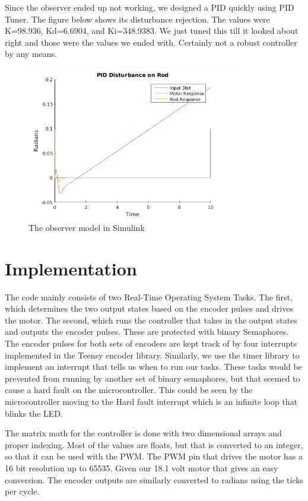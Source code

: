 \documentclass[12pt]{extarticle}
\newenvironment{sect}
  {\adjustwidth{-2.25em}{0pt}}
  {\endadjustwidth}
\begin{document}
\begin{sect}
Since the observer ended up not working, we designed a PID quickly using PID Tuner. The figure below shows its disturbance rejection. The values were K=98.936, Kd=6.6904, and Ki=348.9383. We just tuned this till it looked about right and those were the values we ended with. Certainly not a robust controller by any means.
\begin{figure}[H]
    \centering
    \includegraphics[width=0.8\textwidth]{Images/PID_DIST.png}
    \caption{The observer model in Simulink}
\end{figure}


\end{sect}


\begin{sect}
\section{Implementation}
The code mainly consists of two Real-Time Operating System Tasks. The first, which determines the two output states based on the encoder pulses and drives the motor. The second, which runs the controller that takes in the output states and outputs the encoder pulses. These are protected with binary Semaphores. The encoder pulses for both sets of encoders are kept track of by four interrupts implemented in the Teensy encoder library. Similarly, we use the timer library to implement an interrupt that tells us when to run our tasks. These tasks would be prevented from running by another set of binary semaphores, but that seemed to cause a hard fault on the microcontroller. This could be seen by the microcontroller moving to the Hard fault interrupt which is an infinite loop that blinks the LED.

The matrix math for the controller is done with two dimensional arrays and proper indexing. Most of the values are floats, but that is converted to an integer, so that it can be used with the PWM. The PWM pin that drives the motor has a 16 bit resolution up to 65535. Given our 18.1 volt motor that gives an easy conversion. The encoder outputs are similarly converted to radians using the ticks per cycle.
\end{sect}
\end{document}
